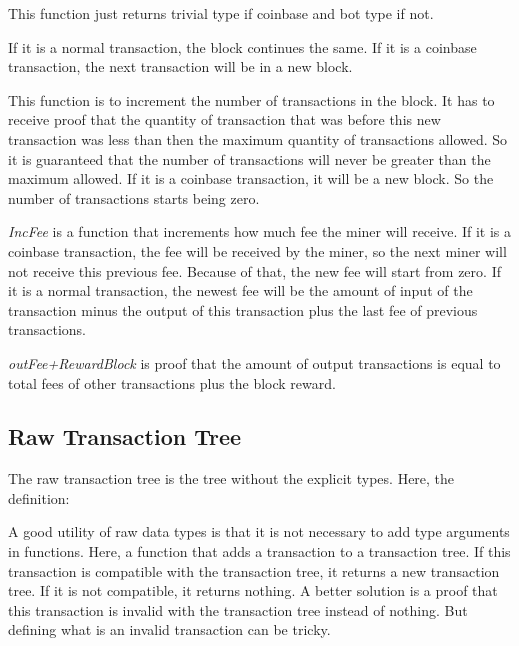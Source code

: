 
This function just returns trivial type if coinbase and bot type if not.


If it is a normal transaction, the block continues the same.
If it is a coinbase transaction, the next transaction will be in a new block.


This function is to increment the number of transactions in the block.
It has to receive proof that the quantity of transaction that was before this new transaction was
less than then the maximum quantity of transactions allowed.
So it is guaranteed that the number of transactions will never be greater than the maximum allowed.
If it is a coinbase transaction, it will be a new block.
So the number of transactions starts being zero.


\emph{IncFee} is a function that increments how much fee the miner will receive.
If it is a coinbase transaction, the fee will be received by the miner,
so the next miner will not receive this previous fee.
Because of that, the new fee will start from zero.
If it is a normal transaction, the newest fee will be the amount of input of the transaction minus
the output of this transaction plus the last fee of previous transactions.


\emph{outFee+RewardBlock} is proof that the amount of output transactions is equal to total fees of
other transactions plus the block reward.

\subsection{Raw Transaction Tree}

The raw transaction tree is the tree without the explicit types.
Here, the definition:


A good utility of raw data types is that it is not necessary to add type arguments in functions.
Here, a function that adds a transaction to a transaction tree.
If this transaction is compatible with the transaction tree,
it returns a new transaction tree.
If it is not compatible, it returns nothing.
A better solution is a proof that this transaction is invalid with the transaction tree
instead of nothing.
But defining what is an invalid transaction can be tricky.


